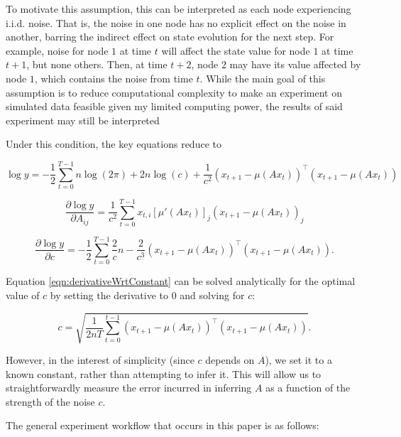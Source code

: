 \documentclass[12pt]{article}
\theoremstyle{definition}
\begin{document}
To motivate this assumption, this can be interpreted as each node experiencing i.i.d. noise. That is, the noise in one node has no explicit effect on the noise in another, barring the indirect effect on state evolution for the next step. For example, noise for node $1$ at time $t$ will affect the state value for node $1$ at time $t + 1$, but none others. Then, at time $t + 2$, node $2$ may have its value affected by node $1$, which contains the noise from time $t$. While the main goal of this assumption is to reduce computational complexity to make an experiment on simulated data feasible given my limited computing power, the results of said experiment may still be interpreted 

Under this condition, the key equations reduce to

\begin{equation}
    \label{eqn:simpleLikelihood}
    \log y = -\frac{1}{2} \sum_{t=0}^{T-1} n \log(2\pi) + 2n \log(c) + \frac{1}{c^2}(x_{t+1} - \mu(Ax_t))^\top (x_{t+1} - \mu(Ax_t))
\end{equation}

\begin{equation}
    \label{eqn:simpleGradAElement}
    \frac{\partial \log y}{\partial A_{ij}} = \frac{1}{c^2} \sum_{t=0}^{T-1} x_{t,i} [\mu'(Ax_t)]_j (x_{t+1} - \mu(Ax_t))_j
\end{equation}

\begin{equation}
    \label{eqn:derivativeWrtConstant}
    \frac{\partial \log y}{\partial c} = - \frac{1}{2} \sum_{t=0}^{T-1} \frac{2}{c} n - \frac{2}{c^3} (x_{t+1} - \mu(Ax_t))^\top (x_{t+1} - \mu(Ax_t)).
\end{equation}

Equation \ref{eqn:derivativeWrtConstant} can be solved analytically for the optimal value of $c$ by setting the derivative to $0$ and solving for $c$:

\begin{equation}
    c = \sqrt{\frac{1}{2nT} \sum_{t=0}^{t-1} (x_{t+1} - \mu(Ax_t))^\top (x_{t+1} - \mu(Ax_t))}.
\end{equation}

However, in the interest of simplicity (since $c$ depends on $A$), we set it to a known constant, rather than attempting to infer it. This will allow us to straightforwardly measure the error incurred in inferring $A$ as a function of the strength of the noise $c$.

The general experiment workflow that occurs in this paper is as follows:
\end{document}
